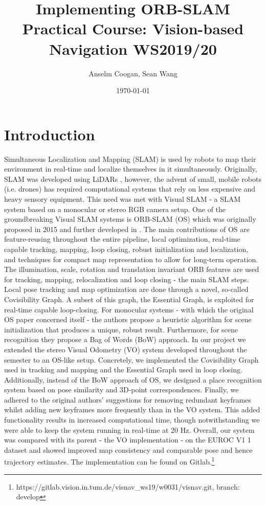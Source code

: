 \documentclass[a4paper, 10pt]{article}
\author{Anselm Coogan, Sean Wang}
\date{\today}
\title{Implementing ORB-SLAM\\\medskip
\large Practical Course: Vision-based Navigation WS2019/20}
\begin{document}
\maketitle

\section{Introduction}
\label{sec:org098c128}
Simultaneous Localization and Mapping (SLAM) is used by robots to map their environment in real-time and localize themselves in it simultaneously.
Originally, SLAM was developed using LiDARs \cite{slam}, however, the advent of small, mobile robots (i.e. drones) has required computational systems that rely on less expensive and heavy sensory equipment. 
This need was met with Visual SLAM - a SLAM system based on a monocular or stereo RGB camera setup.
One of the groundbreaking Visual SLAM systems is ORB-SLAM (OS) which was originally proposed in 2015 \cite{os} and further developed in \cite{os-II}.
The main contributions of OS are feature-reusing throughout the entire pipeline, local optimization, real-time capable tracking, mapping, loop closing, robust initialization and localization, and techniques for compact map representation to allow for long-term operation. 
The illumination, scale, rotation and translation invariant ORB features\cite{orb} are used for tracking, mapping, relocalization and loop closing - the main SLAM steps. 
Local pose tracking and map optimization are done through a novel, so-called Covisibility Graph. A subset of this graph, the Essential Graph, is exploited for real-time capable loop-closing. 
For monocular systems - with which the original OS paper concerned itself - the authors propose a heuristic algorithm for scene initialization that produces a unique, robust result. 
Furthermore, for scene recognition they propose a Bag of Words (BoW) \cite{bow} approach.
In our project we extended the stereo Visual Odometry (VO) system developed throughout the semester to an OS-like setup. 
Concretely, we implemented the Covisibility Graph used in tracking and mapping and the Essential Graph used in loop closing. 
Additionally, instead of the BoW approach of OS, we designed a place recognition system based on pose similarity and 3D-point correspondences. 
Finally, we adhered to the original authors’ suggestions for removing redundant keyframes whilst adding new keyframes more frequently than in the VO system. 
This added functionality results in increased computational time, though notwithstanding we were able to keep the system running in real-time at 20 Hz. 
Overall, our system was compared with its parent - the VO implementation - on the EUROC V1 1 dataset \cite{euroc} and showed improved map consistency and comparable pose and hence trajectory estimates. 
The implementation can be found on Gitlab.\footnote{https://gitlab.vision.in.tum.de/visnav\_ws19/w0031/visnav.git, branch: develop}
\end{document}
